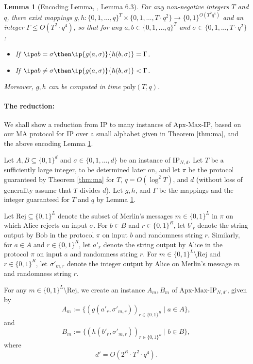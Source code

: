 \documentclass[11pt]{article}
\theoremstyle{plain}
\newtheorem{lem}[thm]{Lemma}
\theoremstyle{remark}
\newcommand{\ma}{\mathrm{MA}}
\newcommand{\IP}{\mathrm{IP}}
\newcommand{\Max}{\mathrm{Max}}
\newcommand{\Apx}{\mathrm{Apx}}
\newcommand{\rej}{\mathrm{Rej}}
\newcommand{\poly}{\mathrm{poly}}
\begin{document}
\begin{lem}[Encoding Lemma, \cite{CW19}, Lemma 6.3]\label{lem:enc}
For any non-negative integers $T$ and $q$, there exist  mappings $g,h: \{0,1, \ldots, q\}^{T} \times \{0,1, \ldots, T \cdot q^2\} \rightarrow\{0,1\}^{O(T^{2}q^{4})}$ and an integer $\Gamma \leq O(T^2 \cdot q^4)$, so that for any $a,b\in \{0,1,\ldots,q\}^{T}$ and $\sigma \in \{0,1, \ldots, T \cdot q^2\}$:
\begin{itemize}
\item If $\ip  a b =\sigma \then\ip{g(a,\sigma)}{h(b,\sigma)}=\Gamma$.
\item If $\ip  a b\neq \sigma \then\ip{g(a,\sigma)}{h(b,\sigma)}<\Gamma$.
\end{itemize}
Moreover, $g,h$ can be computed in time $\poly(T,q)$. 
\end{lem}

\paragraph{The reduction:}

We shall show a reduction from  $\IP$ to many instances of $\Apx$-$\Max$-$\IP$, based on our $\ma$ protocol for $\IP$ over a small alphabet given in Theorem \ref{thm:ma}, and the above encoding Lemma \ref{lem:enc}.

Let $A,B \subseteq \{0,1\}^{d}$ and $\sigma \in \{0,1,\ldots, d\}$ be an instance of $\IP_{N,d}$. Let $T$ be a sufficiently large integer, to be determined later on, and let $\pi$ be the protocol guaranteed by Theorem \ref{thm:ma} for $T$, $q=O(\log^2T)$, and $d$ (without loss of generality assume that $T$ divides $d$).
Let $g,h$, and $\Gamma$ be the mappings and the integer guaranteed for $T$ and $q$ by Lemma \ref{lem:enc}.

Let $\rej \subseteq \{0,1\}^L$ denote the subset of Merlin's messages $m \in \{0,1\}^L$ in $\pi$ on which Alice rejects on input $\sigma$. 
For $b \in B$ and $r \in \{0,1\}^R$, let $b'_r$ denote the string output by Bob in the protocol $\pi$ on input $b$ and randomness string $r$.
Similarly, for $a \in A$ and  $r \in \{0,1\}^R$, let $a'_r$ denote the string output by Alice in the protocol $\pi$ on input $a$ and randomness string $r$. For $m \in \{0,1\}^L \setminus \rej$ and $r \in \{0,1\}^R$, let $\sigma'_{m,r}$ denote the integer output by Alice on Merlin's message $m$ and randomness string $r$.

For any $m \in \{0,1\}^L \setminus \rej$,  we create an instance $A_m,B_m$ of $\Apx$-$\Max$-$\IP_{N,d'}$, given by
$$A_m:= \{ ( g(a'_r, \sigma'_{m,r}))_{r \in \{0,1\}^R} \mid a \in A\},$$
and 
$$B_m:= \{ ( h(b'_r, \sigma'_{m,r}))_{r \in \{0,1\}^R} \mid b \in B\},$$
where 
$$ d' =O(2^R \cdot T^2 \cdot q^4).$$
\end{document}
